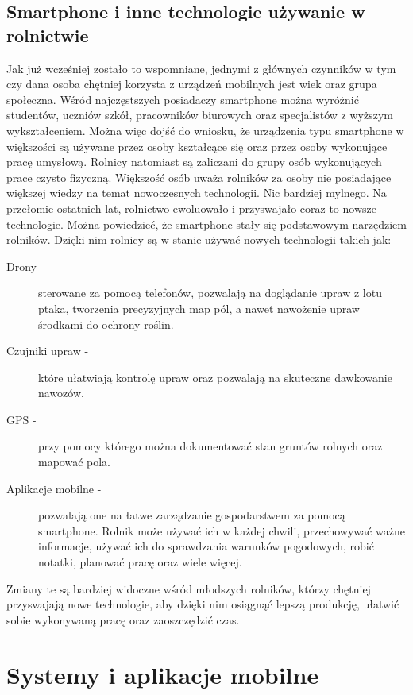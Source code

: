 \documentclass[a4paper,12pt,oneside]{book}
\begin{document}
	\section{Smartphone i inne technologie używanie w rolnictwie}
	Jak już wcześniej zostało to wspomniane, jednymi z głównych czynników w tym czy dana osoba chętniej korzysta z urządzeń mobilnych jest wiek oraz grupa społeczna. Wśród najczęstszych posiadaczy smartphone można wyróżnić studentów, uczniów szkół, pracowników biurowych oraz specjalistów z wyższym wykształceniem. Można więc dojść do wniosku, że urządzenia typu smartphone w większości są używane przez osoby kształcące się oraz przez osoby wykonujące pracę umysłową. Rolnicy natomiast są zaliczani do grupy osób wykonujących prace czysto fizyczną. Większość osób uważa rolników za osoby nie posiadające większej wiedzy na temat nowoczesnych technologii. Nic bardziej mylnego. Na przełomie ostatnich lat, rolnictwo ewoluowało i przyswajało coraz to nowsze technologie. Można powiedzieć, że smartphone stały się podstawowym narzędziem rolników. Dzięki nim rolnicy są w stanie używać nowych technologii takich jak:
	
	\begin{description}
		\item[Drony -] sterowane za pomocą telefonów, pozwalają na doglądanie upraw z lotu ptaka, tworzenia precyzyjnych map pól, a nawet nawożenie upraw środkami do ochrony roślin.
		\item[Czujniki upraw -] które ułatwiają kontrolę upraw oraz pozwalają na skuteczne dawkowanie nawozów.
		\item[GPS -] przy pomocy którego można dokumentować stan gruntów rolnych oraz mapować pola.
		\item[Aplikacje mobilne -] pozwalają one na łatwe zarządzanie gospodarstwem za pomocą smartphone. Rolnik może używać ich w każdej chwili, przechowywać ważne informacje, używać ich do sprawdzania warunków pogodowych, robić notatki, planować pracę oraz wiele więcej.
	\end{description}

	Zmiany te są bardziej widoczne wśród młodszych rolników, którzy chętniej przyswajają nowe technologie, aby dzięki nim osiągnąć lepszą produkcję, ułatwić sobie wykonywaną pracę oraz zaoszczędzić czas.
	
	\newpage
	\thispagestyle{empty}
	\chapter{Systemy i aplikacje mobilne}
\end{document}
